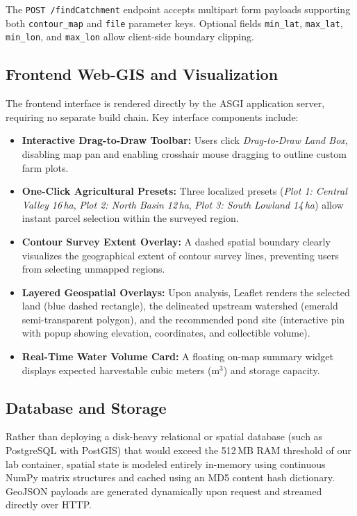 \documentclass[manuscript,screen]{acmart}
\begin{document}
The \texttt{POST /findCatchment} endpoint accepts multipart form payloads supporting both \texttt{contour\_map} and \texttt{file} parameter keys. Optional fields \texttt{min\_lat}, \texttt{max\_lat}, \texttt{min\_lon}, and \texttt{max\_lon} allow client-side boundary clipping.

\subsection{Frontend Web-GIS and Visualization}
The frontend interface is rendered directly by the ASGI application server, requiring no separate build chain. Key interface components include:
\begin{itemize}
    \item \textbf{Interactive Drag-to-Draw Toolbar:} Users click \emph{Drag-to-Draw Land Box}, disabling map pan and enabling crosshair mouse dragging to outline custom farm plots.
    \item \textbf{One-Click Agricultural Presets:} Three localized presets (\emph{Plot 1: Central Valley 16\,ha}, \emph{Plot 2: North Basin 12\,ha}, \emph{Plot 3: South Lowland 14\,ha}) allow instant parcel selection within the surveyed region.
    \item \textbf{Contour Survey Extent Overlay:} A dashed spatial boundary clearly visualizes the geographical extent of contour survey lines, preventing users from selecting unmapped regions.
    \item \textbf{Layered Geospatial Overlays:} Upon analysis, Leaflet renders the selected land (blue dashed rectangle), the delineated upstream watershed (emerald semi-transparent polygon), and the recommended pond site (interactive pin with popup showing elevation, coordinates, and collectible volume).
    \item \textbf{Real-Time Water Volume Card:} A floating on-map summary widget displays expected harvestable cubic meters ($\text{m}^3$) and storage capacity.
\end{itemize}

\subsection{Database and Storage}
Rather than deploying a disk-heavy relational or spatial database (such as PostgreSQL with PostGIS) that would exceed the 512\,MB RAM threshold of our lab container, spatial state is modeled entirely in-memory using continuous NumPy matrix structures and cached using an MD5 content hash dictionary. GeoJSON payloads are generated dynamically upon request and streamed directly over HTTP.
\end{document}
